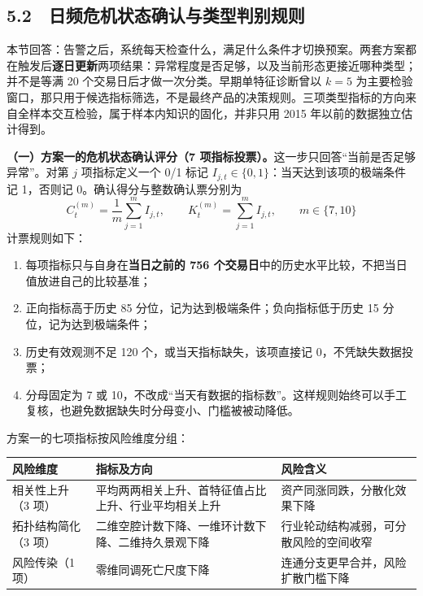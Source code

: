 \documentclass[12pt,a4paper]{ctexart}
\begin{document}
\subsection{5.2　日频危机状态确认与类型判别规则}
本节回答：告警之后，系统每天检查什么，满足什么条件才切换预案。两套方案都在触发后\textbf{逐日更新}两项结果：异常程度是否足够，以及当前形态更接近哪种类型；并不是等满 20 个交易日后才做一次分类。早期单特征诊断曾以 \(k=5\) 为主要检验窗口，那只用于候选指标筛选，不是最终产品的决策规则。三项类型指标的方向来自全样本交互检验，属于样本内知识的固化，并非只用 2015 年以前的数据独立估计得到。\par
\textbf{（一）方案一的危机状态确认评分（7 项指标投票）。}这一步只回答“当前是否足够异常”。对第 \(j\) 项指标定义一个 0/1 标记 \(I_{j,t}\in\{0,1\}\)：当天达到该项的极端条件记 1，否则记 0。确认得分与整数确认票分别为
\[
C_t^{(m)}=\frac{1}{m}\sum_{j=1}^{m}I_{j,t},\qquad K_t^{(m)}=\sum_{j=1}^{m}I_{j,t},\qquad m\in\{7,10\}
\]
计票规则如下：
\begin{enumerate}
\item 每项指标只与自身在\textbf{当日之前的 756 个交易日}中的历史水平比较，不把当日值放进自己的比较基准；
\item 正向指标高于历史 85 分位，记为达到极端条件；负向指标低于历史 15 分位，记为达到极端条件；
\item 历史有效观测不足 120 个，或当天指标缺失，该项直接记 0，不凭缺失数据投票；
\item 分母固定为 7 或 10，不改成“当天有数据的指标数”。这样规则始终可以手工复核，也避免数据缺失时分母变小、门槛被被动降低。
\end{enumerate}
方案一的七项指标按风险维度分组：\par
\begin{center}\small
\begin{tabularx}{\textwidth}{>{\raggedright\arraybackslash}X>{\raggedright\arraybackslash}X>{\raggedright\arraybackslash}X}
\toprule
\textbf{风险维度} & \textbf{指标及方向} & \textbf{风险含义} \\
\midrule
相关性上升（3 项） & 平均两两相关上升、首特征值占比上升、行业平均相关上升 & 资产同涨同跌，分散化效果下降 \\
拓扑结构简化（3 项） & 二维空腔计数下降、一维环计数下降、二维持久景观下降 & 行业轮动结构减弱，可分散风险的空间收窄 \\
风险传染（1 项） & 零维同调死亡尺度下降 & 连通分支更早合并，风险扩散门槛下降 \\
\bottomrule
\end{tabularx}
\end{center}
\end{document}
